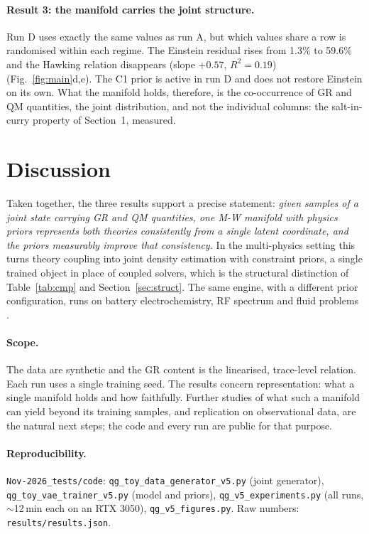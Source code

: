 \documentclass[10pt,twocolumn]{article}
\begin{document}
\paragraph{Result 3: the manifold carries the joint structure.}
Run D uses exactly the same values as run A, but which values share a row is randomised within
each regime. The Einstein residual rises from 1.3\% to 59.6\% and the Hawking relation
disappears (slope $+0.57$, $R^2=0.19$) (Fig.~\ref{fig:main}d,e). The C1 prior is active in run D
and does not restore Einstein on its own. What the manifold holds, therefore, is the
co-occurrence of GR and QM quantities, the joint distribution, and not the individual columns:
the salt-in-curry property of Section~1, measured.

\section{Discussion}
Taken together, the three results support a precise statement: \emph{given samples of a joint
state carrying GR and QM quantities, one M-W manifold with physics priors represents both theories
consistently from a single latent coordinate, and the priors measurably improve that consistency.}
In the multi-physics setting this turns theory coupling into joint density estimation with
constraint priors, a single trained object in place of coupled solvers, which is the
structural distinction of Table~\ref{tab:cmp} and Section~\ref{sec:struct}. The same engine, with a
different prior configuration, runs on battery electrochemistry, RF spectrum and fluid problems
\cite{mw2025,mw2026}.

\paragraph{Scope.} The data are synthetic and the GR content is the linearised, trace-level
relation. Each run uses a single training seed. The results concern representation: what a single manifold holds and how faithfully.
Further studies of what such a manifold can yield beyond its training samples, and replication
on observational data, are the natural next steps; the code and every run are public for that
purpose.

\paragraph{Reproducibility.} \texttt{Nov-2026\_tests/code}: \texttt{qg\_toy\_data\_generator\_v5.py}
(joint generator), \texttt{qg\_toy\_vae\_trainer\_v5.py} (model and priors),
\texttt{qg\_v5\_experiments.py} (all runs, $\sim$12\,min each on an RTX 3050),
\texttt{qg\_v5\_figures.py}. Raw numbers: \texttt{results/results.json}.
\end{document}
